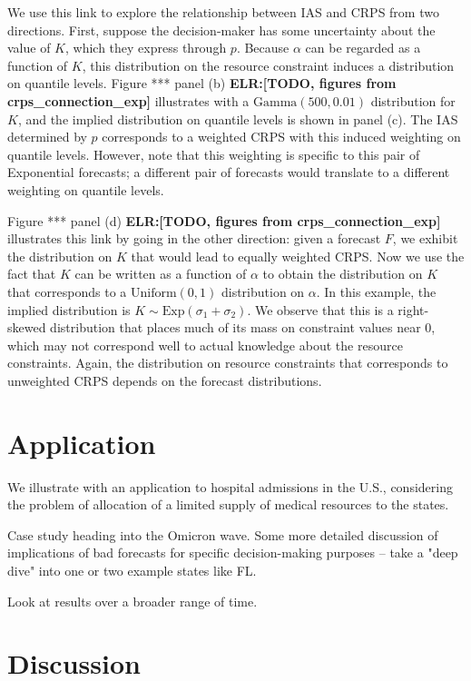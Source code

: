 \documentclass{article}
\def\elr#1{{\color{cyan}\textbf{ELR:[#1]}}}
\begin{document}
We use this link to explore the relationship between IAS and CRPS from two directions. First, suppose the decision-maker has some uncertainty about the value of $K$, which they express through $p$. Because $\alpha$ can be regarded as a function of $K$, this distribution on the resource constraint induces a distribution on quantile levels. Figure *** panel (b) \elr{TODO, figures from crps\_connection\_exp} illustrates with a $\text{Gamma}(500, 0.01)$ distribution for $K$, and the implied distribution on quantile levels is shown in panel (c). The IAS determined by $p$ corresponds to a weighted CRPS with this induced weighting on quantile levels. However, note that this weighting is specific to this pair of Exponential forecasts; a different pair of forecasts would translate to a different weighting on quantile levels.

Figure *** panel (d) \elr{TODO, figures from crps\_connection\_exp} illustrates this link by going in the other direction: given a forecast $F$, we exhibit the distribution on $K$ that would lead to equally weighted CRPS. Now we use the fact that $K$ can be written as a function of $\alpha$ to obtain the distribution on $K$ that corresponds to a $\text{Uniform}(0,1)$ distribution on $\alpha$. In this example, the implied distribution is $K \sim \text{Exp}(\sigma_1 + \sigma_2)$. We observe that this is a right-skewed distribution that places much of its mass on constraint values near 0, which may not correspond well to actual knowledge about the resource constraints. Again, the distribution on resource constraints that corresponds to unweighted CRPS depends on the forecast distributions.

\section{Application}
\label{sec:application}

We illustrate with an application to hospital admissions in the U.S., considering the problem of allocation of a limited supply of medical resources to the states.

Case study heading into the Omicron wave. Some more detailed discussion of implications of bad forecasts for specific decision-making purposes -- take a "deep dive" into one or two example states like FL.

Look at results over a broader range of time.

\section{Discussion}
\label{sec:discussion}
\end{document}
